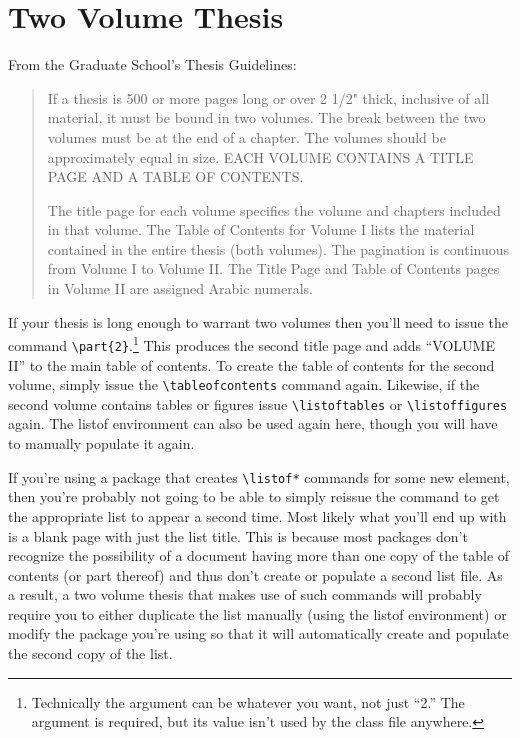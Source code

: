 \section{Two Volume Thesis}
From the Graduate School's Thesis Guidelines:
\begin{quote}
If a thesis is 500 or more pages long or over 2 1/2" thick, inclusive of all material, it 
must be bound in two volumes.  The break between the two volumes must be at the end of a 
chapter.  The volumes should be approximately equal in size.  EACH VOLUME CONTAINS 
A TITLE PAGE AND A TABLE OF CONTENTS.  

The title page for each volume specifies the volume and chapters included in that 
volume.  The Table of Contents for Volume I lists the material contained in the entire thesis 
(both volumes).  The pagination is continuous from Volume I to Volume II.  The Title Page and 
Table of Contents pages in Volume II are assigned Arabic numerals.
\end{quote}

If your thesis is long enough to warrant two volumes then you'll need to issue the command \verb=\part{2}=.\footnote{Technically the argument can be whatever you want, not just ``2.''  The argument is required, but its value isn't used by the class file anywhere.}  This produces the second title page and adds ``VOLUME II'' to the main table of contents.  To create the table of contents for the second volume, simply issue the \verb=\tableofcontents= command again.  Likewise, if the second volume contains tables or figures issue \verb=\listoftables= or \verb=\listoffigures= again.  The listof environment can also be used again here, though you will have to manually populate it again.

If you're using a package that creates \verb=\listof*= commands for some new element, then you're probably not going to be able to simply reissue the command to get the appropriate list to appear a second time.  Most likely what you'll end up with is a blank page with just the list title.  This is because most packages don't recognize the possibility of a document having more than one copy of the table of contents (or part thereof) and thus don't create or populate a second list file.  As a result, a two volume thesis that makes use of such commands will probably require you to either duplicate the list manually (using the listof environment) or modify the package you're using so that it will automatically create and populate the second copy of the list.

